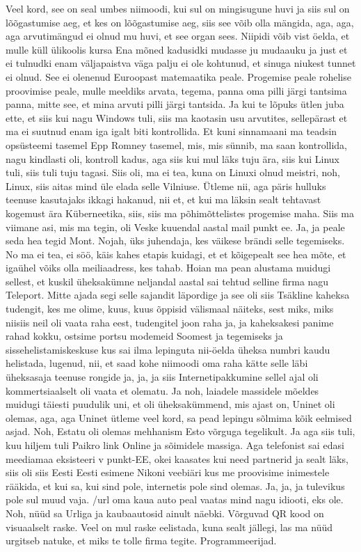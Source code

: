 Veel kord, see on seal umbes niimoodi, kui sul on mingisugune huvi ja siis sul on lõõgastumise aeg, et kes on lõõgastumise aeg, siis see võib olla mängida, aga, aga, aga arvutimängud ei olnud mu huvi, et see organ sees. Niipidi võib vist öelda, et mulle küll ülikoolis kursa Ena mõned kadusidki mudasse ju mudaauku ja just et ei tulnudki enam väljapaistva väga palju ei ole kohtunud, et sinuga niukest tunnet ei olnud. See ei olenenud Euroopast matemaatika peale. Progemise peale rohelise proovimise peale, mulle meeldiks arvata, tegema, panna oma pilli järgi tantsima panna, mitte see, et mina arvuti pilli järgi tantsida. Ja kui te lõpuks ütlen juba ette, et siis kui nagu Windows tuli, siis ma kaotasin usu arvutites, sellepärast et ma ei suutnud enam iga igalt biti kontrollida. Et kuni sinnamaani ma teadsin opsüsteemi tasemel Epp Romney tasemel, mis, mis sünnib, ma saan kontrollida, nagu kindlasti oli, kontroll kadus, aga siis kui mul läks tuju ära, siis kui Linux tuli, siis tuli tuju tagasi. Siis oli, ma ei tea, kuna on Linuxi olnud meistri, noh, Linux, siis aitas mind üle elada selle Vilniuse. Ütleme nii, aga päris hulluks teenuse kasutajaks ikkagi hakanud, nii et, et kui ma läksin sealt tehtavast kogemust ära Küberneetika, siis, siis ma põhimõttelistes progemise maha. Siis ma viimane asi, mis ma tegin, oli Veske kuuendal aastal mail punkt ee. Ja, ja peale seda hea tegid Mont. Nojah, üks juhendaja, kes väikese brändi selle tegemiseks. No ma ei tea, ei söö, käis kahes etapis kuidagi, et et kõigepealt see hea mõte, et igaühel võiks olla meiliaadress, kes tahab.
Hoian ma pean alustama muidugi sellest, et kuskil üheksakümne neljandal aastal sai tehtud selline firma nagu Teleport.
Mitte ajada segi selle sajandit läpordige ja see oli siis Tsäkline kaheksa tudengit, kes me olime, kuus, kuus õppisid välismaal näiteks, sest miks, miks niisiis neil oli vaata raha eest, tudengitel joon raha ja, ja kaheksakesi panime rahad kokku, ostsime portsu modemeid Soomest ja tegemiseks ja sissehelistamiskeskuse kus sai ilma lepinguta nii-öelda üheksa numbri kaudu helistada, lugenud, nii, et saad kohe niimoodi oma raha kätte selle läbi üheksasaja teenuse rongide ja, ja, ja siis Internetipakkumine sellel ajal oli kommertsiaalselt oli vaata et olematu. Ja noh, laiadele massidele mõeldes muidugi täiesti puudulik uni, et oli üheksakümmend, mis ajast on, Uninet oli olemas, aga, aga Uninet ütleme veel kord, sa pead lepingu sõlmima kõik eelmised asjad. Noh, Estatu oli olemas mehhanism Esto võrguga tegelikult. Ja aga siis tuli, kuu hiljem tuli Paikro link Online ja sõimidele massiga. Aga telefonist sai edasi meediamaa eksisteeri v punkt-EE, okei kaasates kui need partnerid ja sealt läks, siis oli siis Eesti Eesti esimene Nikoni veebiäri kus me proovisime inimestele rääkida, et kui sa, kui sind pole, internetis pole sind olemas. Ja, ja, ja tulevikus pole sul muud vaja. /url oma kaua auto peal vaatas mind nagu idiooti, eks ole. Noh, nüüd sa Urliga ja kaubaautosid ainult näebki. Võrguvad QR kood on visuaalselt raske. Veel on mul raske eelistada, kuna sealt jällegi, las ma nüüd urgitseb natuke, et miks te tolle firma tegite. Programmeerijad.
